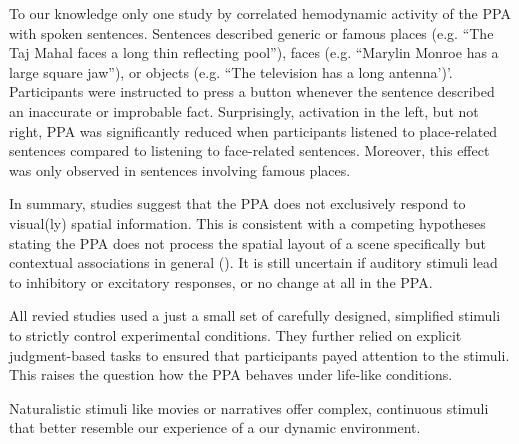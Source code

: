 \documentclass[english]{article}
\begin{document}
To our knowledge only one study by \citep{aziz2008modulation} correlated
hemodynamic activity of the PPA with spoken sentences.  Sentences described
generic or famous places (e.g. ``The Taj Mahal faces a long thin reflecting
pool''), faces  (e.g. ``Marylin Monroe has a large square jaw''), or objects
(e.g. ``The television has a long antenna')'. Participants were instructed to
press a button whenever the sentence described an inaccurate or improbable fact.
Surprisingly, activation in the left, but not right, PPA was significantly
reduced when participants listened to place-related sentences compared to
listening to face-related sentences. Moreover, this effect was only observed in
sentences involving famous places.


In summary, studies suggest that the PPA does not exclusively respond to
visual(ly) spatial information. This is consistent with a competing hypotheses
stating the PPA does not process the spatial layout of a scene specifically but
contextual associations in general (\citep{aminoff2006parahippocampal,
aminoff2013role}). It is still uncertain if auditory stimuli lead to inhibitory
or excitatory responses, or no change at all in the PPA.


All revied studies used a just a small set of carefully designed, simplified
stimuli to strictly control experimental conditions. They further relied on
explicit judgment-based tasks to ensured that participants payed attention to
the stimuli. This raises the question how the PPA behaves under life-like conditions.


Naturalistic stimuli like movies \citep{hasson2008neurocinematics,
sonkusare2019naturalistic} or narratives \citep{honey2012not,
lerner2011topographic, silbert2014coupled} offer complex, continuous stimuli
that better resemble our experience of a our dynamic environment.
\end{document}
